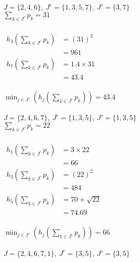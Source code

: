 \documentclass[a4paper, fleqn]{article}
\begin{document}
\vspace{1pt}\\
$J=\{2,4,6\},\ J^c=\{1,3,5,7\},\ J'=\{3,7\}$\\
\vspace{1pt}
$\sum_{k\in J^c}p_k=31$\\
\vspace{1pt}\\
$\begin{aligned}h_3\left(\sum_{k\in J^c}p_k\right)&=(31)^2\\&=961\end{aligned}$\\
$\begin{aligned}h_7\left(\sum_{k\in J^c}p_k\right)&=1.4\times31\\&=43.4\end{aligned}$\\
\vspace{1pt}\\
$\min_{j\in J'}\left(h_j\left(\sum_{k\in J^c}p_k\right)\right)=43.4$\\
\vspace{1pt}\\
$J=\{2,4,6,7\},\ J^c=\{1,3,5\},\ J'=\{1,3,5\}$\\
\vspace{1pt}
$\sum_{k\in J^c}p_k=22$\\
\vspace{1pt}\\
$\begin{aligned}h_1\left(\sum_{k\in J^c}p_k\right)&=3\times22\\&=66\end{aligned}$\\
$\begin{aligned}h_3\left(\sum_{k\in J^c}p_k\right)&=(22)^2\\&=484\end{aligned}$\\
$\begin{aligned}h_5\left(\sum_{k\in J^c}p_k\right)&=70+\sqrt{22}\\&=74.69\end{aligned}$\\
\vspace{1pt}\\
$\min_{j\in J'}\left(h_j\left(\sum_{k\in J^c}p_k\right)\right)=66$\\
\vspace{1pt}\\
$J=\{2,4,6,7,1\},\ J^c=\{3,5\},\ J'=\{3,5\}$\\
\end{document}
